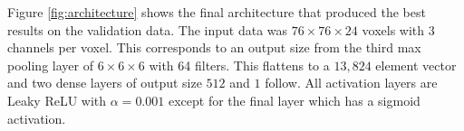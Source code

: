 Figure \ref{fig:architecture} shows the final architecture that produced the best results on the validation data. 
The input data was $76 \times 76 \times 24$ voxels with $3$ channels per voxel. 
This corresponds to an output size from the third max pooling layer of $6 \times 6 \times 6$ with 64 filters. 
This flattens to a $13,824$ element vector and two dense layers of output size $512$ and $1$ follow. 
All activation layers are Leaky ReLU with $\alpha=0.001$ except for the final layer which has a sigmoid activation.